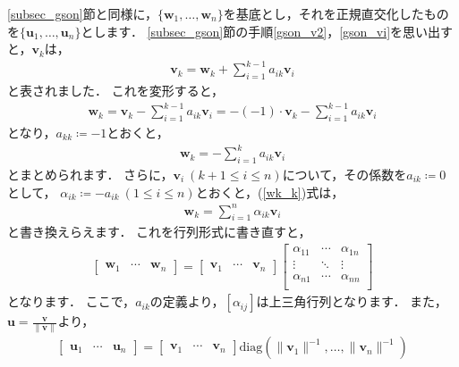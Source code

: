 \documentclass[dvipdfmx]{jsarticle}
\theoremstyle{definition}
\newcommand{\diag}[1]{\mathrm{diag}(#1)}
\begin{document}
\ref{subsec_gson}節と同様に，$\{ \bm{w}_1, \ldots, \bm{w}_n \}$を基底とし，それを正規直交化したものを$\{ \bm{u}_1, \ldots, \bm{u}_n \}$とします．
\ref{subsec_gson}節の手順\ref{gson_v2}，\ref{gson_vi}を思い出すと，$\bm{v}_k$は，
\begin{align}
    \bm{v}_k = \bm{w}_k + \sum_{i=1}^{k-1} a_{ik}\bm{v}_i
\end{align}
と表されました．
これを変形すると，
\begin{align}
    \bm{w}_k = \bm{v}_k - \sum_{i=1}^{k-1} a_{ik}\bm{v}_i
    = -(-1) \cdot \bm{v}_k - \sum_{i=1}^{k-1} a_{ik}\bm{v}_i
\end{align}
となり，$a_{kk} \coloneqq -1$とおくと，
\begin{align}
    \bm{w}_k = - \sum_{i=1}^{k} a_{ik}\bm{v}_i
    \label{wk_k}
\end{align}
とまとめられます．
さらに，$\bm{v}_{i} \ (k+1 \leq i \leq n)$について，その係数を$a_{ik} \coloneqq 0$として，
$\alpha_{ik} \coloneqq -a_{ik} \ (1 \leq i \leq n)$とおくと，(\ref{wk_k})式は，
\begin{align}
    \bm{w}_k = \sum_{i=1}^{n} \alpha_{ik}\bm{v}_i
    \label{wk_n}
\end{align}
と書き換えらえます．
これを行列形式に書き直すと，
\begin{align}
    \begin{bmatrix} \bm{w}_1 & \cdots & \bm{w}_n \end{bmatrix}
    = \begin{bmatrix} \bm{v}_1 & \cdots & \bm{v}_n \end{bmatrix}
    \begin{bmatrix}
        \alpha_{11} & \cdots & \alpha_{1n} \\
        \vdots & \ddots & \vdots \\
        \alpha_{n1} & \cdots & \alpha_{nn} \\
    \end{bmatrix}
    \label{wva}
\end{align}
となります．
ここで，$a_{ik}$の定義より，$[\alpha_{ij}]$は上三角行列となります．
また，$\displaystyle \bm{u} = \frac{\bm{v}}{\| \bm{v} \|}$より，
\begin{align}
    \begin{bmatrix} \bm{u}_1 & \cdots & \bm{u}_n \end{bmatrix}
    = \begin{bmatrix} \bm{v}_1 & \cdots & \bm{v}_n \end{bmatrix}
   \diag{\| \bm{v}_1 \|^{-1}, \ldots, \| \bm{v}_n \|^{-1}}
\end{align}
\end{document}

